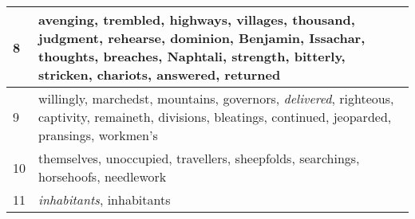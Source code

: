 \begin{center}
\begin{longtable}{l|p{3.75in}}
8 & avenging, trembled, highways, villages, thousand, judgment, rehearse, dominion, Benjamin, Issachar, thoughts, breaches, Naphtali, strength, bitterly, stricken, chariots, answered, returned\\ \hline 
9 & willingly, marchedst, mountains, governors, \emph{delivered}, righteous, captivity, remaineth, divisions, bleatings, continued, jeoparded, pransings, workmen's\\ \hline 
10 & themselves, unoccupied, travellers, sheepfolds, searchings, horsehoofs, needlework\\ \hline 
11 & \emph{inhabitants}, inhabitants\\ \hline 
\end{longtable}
\end{center}





